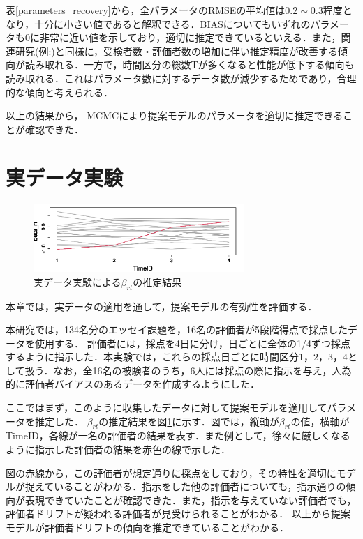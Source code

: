 \documentclass[twocolumn,10pt]{jsarticle}
\begin{document}
表\ref{parameters_recovery}から，全パラメータのRMSEの平均値は$0.2\sim0.3$程度となり，十分に小さい値であると解釈できる．BIASについてもいずれのパラメータも0に非常に近い値を示しており，適切に推定できているといえる．また，関連研究(例:\cite{UtoUeno,YagiUto})と同様に，受検者数・評価者数の増加に伴い推定精度が改善する傾向が読み取れる．一方で，時間区分の総数Tが多くなると性能が低下する傾向も読み取れる．これはパラメータ数に対するデータ数が減少するためであり，合理的な傾向と考えられる．

以上の結果から， MCMCにより提案モデルのパラメータを適切に推定できることが確認できた．

\vspace{-2mm}
\section{実データ実験}
\vspace{-2mm}
\begin{figure}[b]
  \centering
 \includegraphics[width=8cm]{img/beta_rt_img_4.png}
 \vskip3mm
 \caption{実データ実験による$\beta_{rt}$の推定結果}
  \label{beta_rt_data}
\end{figure}
本章では，実データの適用を通して，提案モデルの有効性を評価する．

本研究では，134名分のエッセイ課題を，16名の評価者が5段階得点で採点したデータを使用する．
評価者には，採点を4日に分け，日ごとに全体の1/4ずつ採点するように指示した．本実験では，これらの採点日ごとに時間区分1，2，3，4として扱う．なお，全16名の被験者のうち，6人には採点の際に指示を与え，人為的に評価者バイアスのあるデータを作成するようにした．

ここではまず，このように収集したデータに対して提案モデルを適用してパラメータを推定した．
$\beta_{rt}$の推定結果を図\ref{beta_rt_data}に示す．図では，縦軸が$\beta_{rt}$の値，横軸がTimeID，各線が一名の評価者の結果を表す．また例として，徐々に厳しくなるように指示した評価者の結果を赤色の線で示した．

図の赤線から，この評価者が想定通りに採点をしており，その特性を適切にモデルが捉えていることがわかる．指示をした他の評価者についても，指示通りの傾向が表現できていたことが確認できた．また，指示を与えていない評価者でも，評価者ドリフトが疑われる評価者が見受けられることがわかる．
以上から提案モデルが評価者ドリフトの傾向を推定できていることがわかる．
\end{document}
